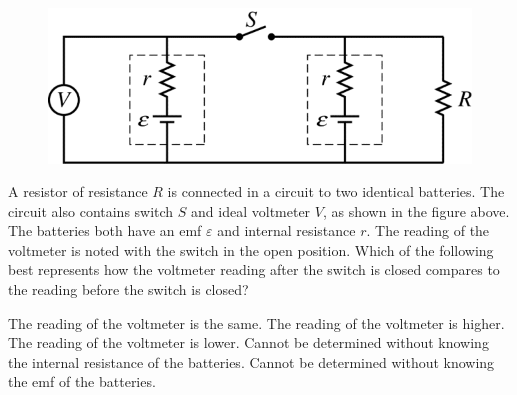 \begin{figure}[H]
    \centering
    \includegraphics[scale=0.3]{images/img-008-013.png}
\end{figure}

\begin{questions}\setcounter{question}{15}\question
A resistor of resistance $R$ is connected in a circuit to two identical batteries. The circuit also contains switch $S$ and ideal voltmeter $V$, as shown in the figure above. The batteries both have an emf $\varepsilon$ and internal resistance $r$. The reading of the voltmeter is noted with the switch in the open position. Which of the following best represents how the voltmeter reading after the switch is closed compares to the reading before the switch is closed?

\begin{choices}
\choice The reading of the voltmeter is the same.
\choice The reading of the voltmeter is higher.
\choice The reading of the voltmeter is lower.
\choice Cannot be determined without knowing the internal resistance of the batteries.
\choice Cannot be determined without knowing the emf of the batteries.
\end{choices}\end{questions}

